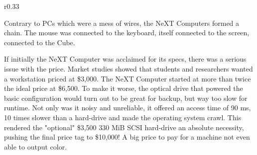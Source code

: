  


\begin{wrapfigure}[9]{r}{0.33\textwidth}
\centering
{}
\end{wrapfigure}


Contrary to PCs which were a mess of wires, the NeXT Computers formed a chain. The mouse was connected to the keyboard, itself connected to the screen, connected to the Cube.\\


\par


If initially the NeXT Computer was acclaimed for its specs, there was a serious issue with the price. Market studies showed that students and researchers wanted a workstation priced at \$3,000. The NeXT Computer started at more than twice the ideal price at \$6,500. To make it worse, the optical drive that powered the basic configuration would turn out to be great for backup, but way too slow for runtime. Not only was it noisy and unreliable, it offered an access time of 90 ms, 10 times slower than a hard-drive and made the operating system crawl. This rendered the "optional" \$3,500 330 MiB SCSI hard-drive an absolute necessity, pushing the final price tag to \$10,000! A big price to pay for a machine not even able to output color.\\
\par




